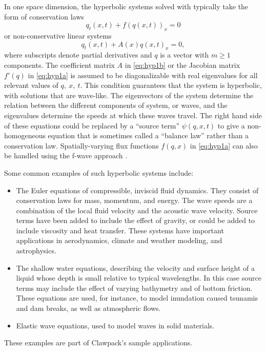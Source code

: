 In one space dimension, the hyperbolic systems solved with
\clawpack typically take the form of conservation laws
\begin{equation}\label{eq:hyp1a}
q_t(x,t) + f(q(x,t))_x = 0
\end{equation}
or non-conservative linear systems
\begin{equation}\label{eq:hyp1b}
q_t(x,t) + A(x) q(x,t)_x = 0,
\end{equation}
where subscripts denote partial derivatives and $q$ is a vector with
$m\ge 1$ components.  The coefficient matrix $A$ in \cref{eq:hyp1b} or
the Jacobian matrix $f'(q)$ in \cref{eq:hyp1a} is assumed to be
diagonalizable with real eigenvalues for all relevant values of
$q,~x,~t$.  This condition guarantees that the system is hyperbolic,
with solutions that are wave-like.  The eigenvectors of the system
determine the relation between the different components
of system, or waves, and the eigenvalues determine the speeds at which these
waves travel.  The right hand side of these equations could be
replaced by a ``source term'' $\psi(q,x,t)$ to give a non-homogeneous
equation that is sometimes called a ``balance law'' rather than a
conservation law.  Spatially-varying flux functions $f(q,x)$ in
\cref{eq:hyp1a} can also be handled using the f-wave approach
\cite{db-rjl-sm-jr:vcflux}.

Some common examples of such hyperbolic systems include:
\begin{itemize}
    \item The Euler equations of compressible, inviscid fluid dynamics.
        They consist of conservation laws for mass, momentum, and energy.
        The wave speeds are a combination of the local fluid velocity
        and the acoustic wave velocity.  Source terms have been added
        to include the effect of gravity, or could be added to include 
        viscosity and heat transfer.
        These systems have important applications in
        aerodynamics, climate and weather modeling, and astrophysics.
    \item The shallow water equations, describing the velocity and
        surface height of a liquid whose depth is small relative to
        typical wavelengths.  In this case source terms may include
        the effect of varying bathymetry and of bottom friction.
        These equations are used, for instance, to model inundation
        caused tsunamis and dam breaks, as well as atmospheric flows.
    \item Elastic wave equations, used to model waves in solid
    materials. 
\end{itemize}
These examples are part of Clawpack's sample applications.

